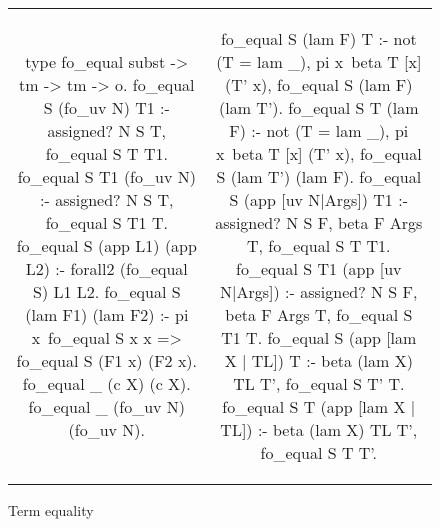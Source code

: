 \begin{figure*}
  \begin{tabular}{cc}
    \begin{minipage}{.50\textwidth}
      \begin{elpicode}
        type fo_equal subst -> tm -> tm -> o.
        fo_equal S (fo_uv N) T1 :- assigned? N S T, fo_equal S T T1.
        fo_equal S T1 (fo_uv N) :- assigned? N S T, fo_equal S T1 T.
        fo_equal S (app L1) (app L2) :- forall2 (fo_equal S) L1 L2.
        fo_equal S (lam F1) (lam F2) :- 
          pi x\ fo_equal S x x => fo_equal S (F1 x) (F2 x).
        fo_equal _ (c X) (c X).
        fo_equal _ (fo_uv N) (fo_uv N).
      \end{elpicode}
    \end{minipage}
    &
    \begin{minipage}{.50\textwidth}
      \begin{elpicode}

        fo_equal S (lam F) T :- not (T = lam _), 
          pi x\ beta T [x] (T' x), fo_equal S (lam F) (lam T').
        fo_equal S T (lam F) :- not (T = lam _), 
          pi x\ beta T [x] (T' x), fo_equal S (lam T') (lam F).
        fo_equal S (app [uv N|Args]) T1 :- 
          assigned? N S F, beta F Args T, fo_equal S T T1.
        fo_equal S T1 (app [uv N|Args]) :- 
          assigned? N S F, beta F Args T, fo_equal S T1 T.
        fo_equal S (app [lam X | TL]) T :- beta (lam X) TL T', fo_equal S T' T.
        fo_equal S T (app [lam X | TL]) :- beta (lam X) TL T', fo_equal S T T'.
      \end{elpicode}
    \end{minipage}
  \end{tabular}
  \caption{Term equality}
  \label{code:term-equal}
\end{figure*}

